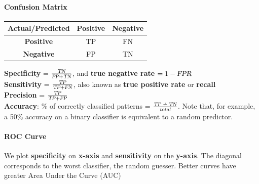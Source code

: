 \documentclass[10pt]{report}
\begin{document}
\paragraph{Confusion Matrix} \begin{center}
	\begin{tabular}{|c|c|c|}
		\hline
		Actual/Predicted & \textbf{Positive} & \textbf{Negative}\\
		\hline
		\textbf{Positive} & TP & FN\\
		\hline
		\textbf{Negative} & FP & TN\\
		\hline
	\end{tabular}
\end{center}
\textbf{Specificity} = $\frac{\textsl{TN}}{\textsl{FP} + \textsl{TN}}$, and \textbf{true negative rate} $= 1 - \textsl{FPR}$\\
\textbf{Sensitivity} = $\frac{\textsl{TP}}{\textsl{TP} + \textsl{FN}}$, also known as \textbf{true positive rate} or \textbf{recall}\\
\textbf{Precision} = $\frac{\textsl{TP}}{\textsl{TP} + \textsl{FP}}$\\
\textbf{Accuracy}: \% of correctly classified patterns = $\frac{\textsl{TP + TN}}{\textsl{total}}$. Note that, for example, a 50\% accuracy on a binary classifier is equivalent to a random predictor.
\paragraph{ROC Curve} We plot \textbf{specificity} on \textbf{x-axis} and \textbf{sensitivity} on the \textbf{y-axis}. The diagonal corresponds to the worst classifier, the random guesser. Better curves have greater Area Under the Curve (AUC)
\end{document}
